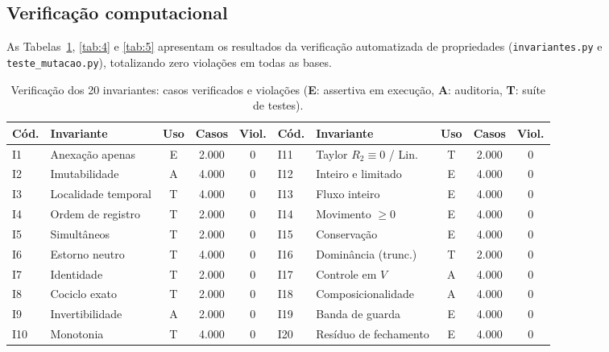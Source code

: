 \documentclass[11pt, a4paper]{article}
\theoremstyle{definition}
\theoremstyle{plain}
\theoremstyle{remark}
\begin{document}
\subsection{Verificação computacional}\label{sec:6.4}

As Tabelas~\ref{tab:3}, \ref{tab:4} e \ref{tab:5} apresentam os resultados da verificação automatizada de propriedades (\texttt{invariantes.py} e \texttt{teste\_mutacao.py}), totalizando zero violações em todas as bases.

\begin{table}[htbp]
\centering
\small
\setlength{\tabcolsep}{4pt}
\begin{tabular}{@{}llccc@{\hspace{1.2em}}llccc@{}}
\toprule
\textbf{Cód.} & \textbf{Invariante} & \textbf{Uso} & \textbf{Casos} & \textbf{Viol.} & \textbf{Cód.} & \textbf{Invariante} & \textbf{Uso} & \textbf{Casos} & \textbf{Viol.} \\
\midrule
I1  & Anexação apenas     & E & 2.000 & 0 & I11 & Taylor $R_2\equiv 0$ / Lin. & T & 2.000 & 0 \\
I2  & Imutabilidade       & A & 4.000 & 0 & I12 & Inteiro e limitado          & E & 4.000 & 0 \\
I3  & Localidade temporal & T & 4.000 & 0 & I13 & Fluxo inteiro               & E & 4.000 & 0 \\
I4  & Ordem de registro   & T & 2.000 & 0 & I14 & Movimento $\ge 0$           & E & 4.000 & 0 \\
I5  & Simultâneos         & T & 2.000 & 0 & I15 & Conservação                 & E & 4.000 & 0 \\
I6  & Estorno neutro      & T & 4.000 & 0 & I16 & Dominância (trunc.)         & T & 2.000 & 0 \\
I7  & Identidade          & T & 2.000 & 0 & I17 & Controle em $V$             & A & 4.000 & 0 \\
I8  & Cociclo exato       & T & 2.000 & 0 & I18 & Composicionalidade          & A & 4.000 & 0 \\
I9  & Invertibilidade     & A & 2.000 & 0 & I19 & Banda de guarda             & E & 4.000 & 0 \\
I10 & Monotonia           & T & 4.000 & 0 & I20 & Resíduo de fechamento       & E & 4.000 & 0 \\
\bottomrule
\end{tabular}
\caption{Verificação dos 20 invariantes: casos verificados e violações (\textbf{E}: assertiva em execução, \textbf{A}: auditoria, \textbf{T}: suíte de testes).}
\label{tab:3}
\end{table}
\end{document}
